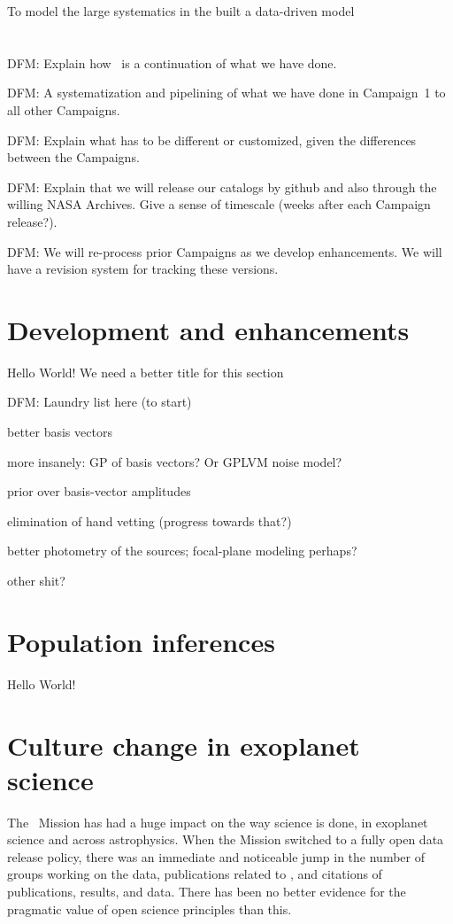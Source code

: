 \documentclass[12pt,preprint]{aastex}
\begin{document}
To model the large systematics in the
\citet{Foreman-Mackey:2015} built a data-driven model

\section{\thecatalog}

DFM:  Explain how \thecatalog\ is a continuation of what we have done.

DFM:  A systematization and pipelining of what we have done in Campaign~1 to
all other Campaigns.

DFM:  Explain what has to be different or customized, given the differences
between the Campaigns.

DFM:  Explain that we will release our catalogs by github and also through
the willing NASA Archives.
Give a sense of timescale (weeks after each Campaign release?).

DFM:  We will re-process prior Campaigns as we develop enhancements.
We will have a revision system for tracking these versions.

\section{Development and enhancements}

Hello World!  We need a better title for this section

DFM:  Laundry list here (to start)

better basis vectors

more insanely: GP of basis vectors?  Or GPLVM noise model?

prior over basis-vector amplitudes

elimination of hand vetting (progress towards that?)

better photometry of the sources; focal-plane modeling perhaps?

other shit?

\section{Population inferences}

Hello World!

\section{Culture change in exoplanet science}

The \kepler\ Mission has had a huge impact on the way science is done,
in exoplanet science and across astrophysics.
When the Mission switched to a fully open data release policy, there
was an immediate and noticeable jump in the number of groups working on
the data, publications related to \kepler, and citations of \kepler
publications, results, and data.
There has been no better evidence for the pragmatic value of open
science principles than this.
\end{document}
